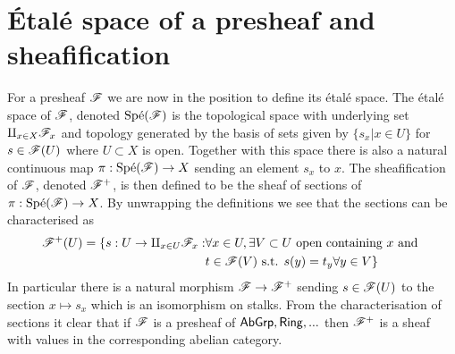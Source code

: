 \documentclass{memoir}
\begin{document}
\section{\'Etal\'e space of a presheaf and sheafification}
For a presheaf $\mathscr{F}$ we are now in the position to define its \'etal\'e space.
The \'etal\'e space of $\mathscr{F}$, denoted $\text{Sp\'e}(\mathscr{F})$ is the topological space with underlying set $\amalg_{x\in X}\mathscr{F}_x$ and topology generated by the basis of sets given by $\{s_x|x\in U\}$ for $s\in \mathscr{F}(U)$ where $U\subset X$ is open.
Together with this space there is also a natural continuous map $\pi:\text{Sp\'e}(\mathscr{F})\to X$ sending an element $s_x$ to $x$.
The sheafification of $\mathscr{F}$, denoted $\mathscr{F}^+$, is then defined to be the sheaf of sections of $\pi:\text{Sp\'e}(\mathscr{F})\to X$.
By unwrapping the definitions we see that the sections can be characterised as
\begin{align}
    \mathscr{F}^+(U) = \{s:U\to\amalg_{x\in U}\mathscr{F}_x : & \forall x\in U, \exists V\subset U \text{ open containing $x$ and } \nonumber \\
                                                            & t\in\mathscr{F}(V) \text{ s.t. }  s(y) = t_y \forall y\in V\}
\end{align}
In particular there is a natural morphism $\mathscr{F} \to \mathscr{F}^+$ sending $s\in \mathscr{F}(U)$ to the section $x\mapsto s_x$ which is an isomorphism on stalks.
From the characterisation of sections it clear that if $\mathscr{F}$ is a presheaf of ${\normalfont\mathsf{AbGrp}},{\normalfont\mathsf{Ring}},...$ then $\mathscr{F}^+$ is a sheaf with values in the corresponding abelian category.
\end{document}
